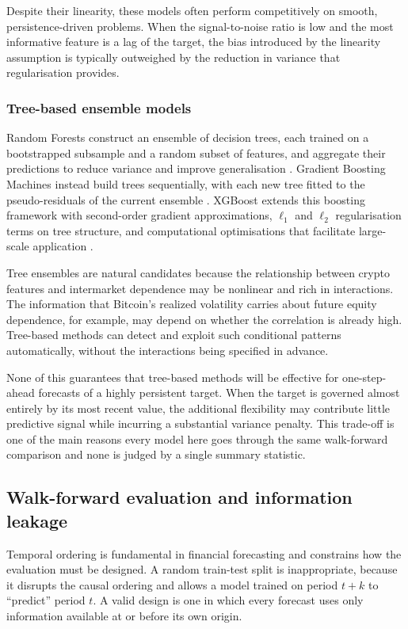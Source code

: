 Despite their linearity, these models often perform competitively on smooth, persistence-driven problems. When the signal-to-noise ratio is low and the most informative feature is a lag of the target, the bias introduced by the linearity assumption is typically outweighed by the reduction in variance that regularisation provides.

\subsubsection{Tree-based ensemble models}

Random Forests construct an ensemble of decision trees, each trained on a bootstrapped subsample and a random subset of features, and aggregate their predictions to reduce variance and improve generalisation \cite{breiman2001}. Gradient Boosting Machines instead build trees sequentially, with each new tree fitted to the pseudo-residuals of the current ensemble \cite{friedman2001}. XGBoost extends this boosting framework with second-order gradient approximations, $\ell_1$ and $\ell_2$ regularisation terms on tree structure, and computational optimisations that facilitate large-scale application \cite{chen2016}.

Tree ensembles are natural candidates because the relationship between crypto features and intermarket dependence may be nonlinear and rich in interactions. The information that Bitcoin's realized volatility carries about future equity dependence, for example, may depend on whether the correlation is already high. Tree-based methods can detect and exploit such conditional patterns automatically, without the interactions being specified in advance.

None of this guarantees that tree-based methods will be effective for one-step-ahead forecasts of a highly persistent target. When the target is governed almost entirely by its most recent value, the additional flexibility may contribute little predictive signal while incurring a substantial variance penalty. This trade-off is one of the main reasons every model here goes through the same walk-forward comparison and none is judged by a single summary statistic.

\subsection{Walk-forward evaluation and information leakage}

Temporal ordering is fundamental in financial forecasting and constrains how the evaluation must be designed. A random train-test split is inappropriate, because it disrupts the causal ordering and allows a model trained on period $t + k$ to ``predict'' period $t$. A valid design is one in which every forecast uses only information available at or before its own origin.

